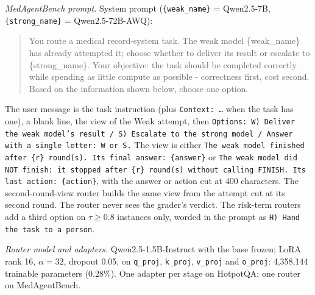 \documentclass{article}
\begin{document}
\emph{MedAgentBench prompt.} System prompt (\texttt{\{weak\_name\}} = Qwen2.5-7B, \texttt{\{strong\_name\}} = Qwen2.5-72B-AWQ):
\begin{quote}\small\ttfamily
You route a medical record-system task. The weak model \{weak\_name\} has already attempted it; choose whether to deliver its result or escalate to \{strong\_name\}. Your objective: the task should be completed correctly while spending as little compute as possible - correctness first, cost second. Based on the information shown below, choose one option.
\end{quote}
The user message is the task instruction (plus \texttt{Context: \ldots} when the task has one), a blank line, the view of the Weak attempt, then \texttt{Options: W) Deliver the weak model's result / S) Escalate to the strong model / Answer with a single letter: W or S.} The view is either \texttt{The weak model finished after \{r\} round(s). Its final answer: \{answer\}} or \texttt{The weak model did NOT finish: it stopped after \{r\} round(s) without calling FINISH. Its last action: \{action\}}, with the answer or action cut at 400 characters. The second-round-view router builds the same view from the attempt cut at its second round. The router never sees the grader's verdict. The risk-term routers add a third option on $\tau\ge0.8$ instances only, worded in the prompt as \texttt{H) Hand the task to a person}.

\emph{Router model and adapters.} Qwen2.5-1.5B-Instruct with the base frozen; LoRA rank 16, $\alpha{=}32$, dropout 0.05, on \texttt{q\_proj}, \texttt{k\_proj}, \texttt{v\_proj} and \texttt{o\_proj}: 4,358,144 trainable parameters (0.28\%). One adapter per stage on HotpotQA; one router on MedAgentBench.
\end{document}
